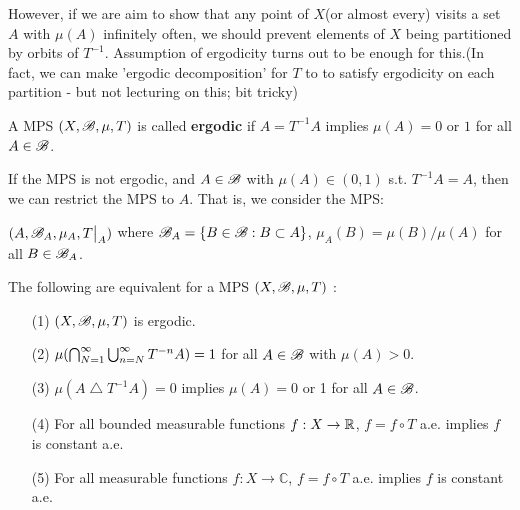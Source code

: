 \documentclass[10pt,a4paper]{report}
\begin{document}
However, if we are aim to show that any point of $X$(or almost every) visits a set $A$ with $\mu(A)$ infinitely often, we should prevent elements of $X$ being partitioned by orbits of $T^{-1}$. Assumption of ergodicity turns out to be enough for this.(In fact, we can make 'ergodic decomposition' for $T$ to to satisfy ergodicity on each partition - but not lecturing on this; bit tricky)
\s

 A MPS $(X,\mathscr{B}, \mu, T)$ is called \textbf{ergodic} if $A=T^{-1}A$ implies $\mu(A) =0$ or $1$ for all $A \in \mathscr{B}$.
\s

If the MPS is not ergodic, and $A \in \mathscr{B}$ with $\mu(A) \in (0,1)$ s.t. $T^{-1}A =A$, then we can restrict the MPS to $A$. That is, we consider the MPS:

\quad $(A,\mathscr{B}_A, \mu_A, T\big|_A)$ where $\mathscr{B}_A = \{B\in \mathscr{B} : B \subset A \}$, $\mu_A(B) = \mu(B)/\mu(A)$ for all $B\in \mathscr{B}_A$.
\s

\thm The following are equivalent for a MPS $(X,\mathscr{B}, \mu, T)$ :
\begin{itemize}
\item[(1)] $(X,\mathscr{B}, \mu, T)$ is ergodic.
\item[(2)] $\mu(\bigcap_{N=1}^{\infty}\bigcup_{n=N}^{\infty} T^{-n} A ) =1$ for all $A\in \mathscr{B}$ with $\mu(A) >0$.
\item[(3)] $\mu(A \bigtriangleup T^{-1} A) =0$ implies $\mu(A) =0$ or 1 for all $A\in \mathscr{B}$.
\item[(4)] For all bounded measurable functions $f:X\rightarrow \mathbb{R}$, $f = f \circ T$ a.e. implies $f$ is constant a.e.
\item[(5)] For all measurable functions $f:X\rightarrow \mathbb{C}$, $f = f \circ T$ a.e. implies $f$ is constant a.e.
\end{itemize}
\s
\end{document}
